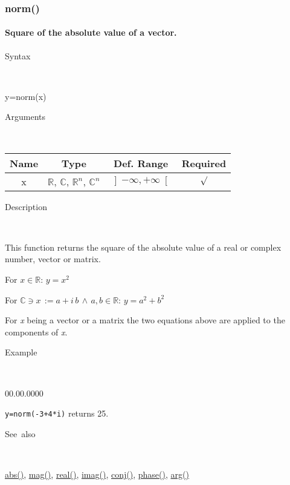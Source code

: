 \newpage
\subsubsection*{\hypertarget{norm}{}{\Large norm()}}


\paragraph{\label{par:norm}Square of the absolute value of a vector.}

\begin{description}
\item [Syntax]~
\end{description}
y=norm(x)

\begin{description}
\item [Arguments]~
\end{description}
\begin{tabular}{|c|c|c|c|}
\hline 
Name&
Type&
Def. Range&
Required\tabularnewline
\hline
\hline 
x&
$\mathbb{R}$, $\mathbb{C}$, $\mathbb{R}^{n}$, $\mathbb{C}^{n}$&
$\left]-\infty,+\infty\right[$&
$\surd$\tabularnewline
\hline
\end{tabular}

\begin{description}
\item [Description]~
\end{description}
This function returns the square of the absolute value of a real or
complex number, vector or matrix.

\medskip{}
For $x\in\mathbb{R}$: $y=x^{2}$
\medskip{}

For $\mathbb{\mathbb{C}}\ni x\,:=a+i\, b\,\wedge\, a,b\in\mathbb{R}$:
$y=a^{2}+b^{2}$
\medskip{}

For \textit{x} being a vector or a matrix the two equations above
are applied to the components of \textit{x}.

\begin{description}
\item [Example]~
\end{description}
\begin{lyxlist}{00.00.0000}
\item [\texttt{y=norm(-3+4{*}i)}]returns 25.
\end{lyxlist}
\begin{description}
\item [See~also]~
\end{description}
\textcolor{blue}{\hyperlink{abs}{abs()}}, \textcolor{blue}{\hyperlink{mag}{mag()}},
\textcolor{blue}{\hyperlink{real}{real()}}, \textcolor{blue}{\hyperlink{imag}{imag()}},
\textcolor{blue}{\hyperlink{conj}{conj()}}, \textcolor{blue}{\hyperlink{phase}{phase()}},
\textcolor{blue}{\hyperlink{arg}{arg()}}


